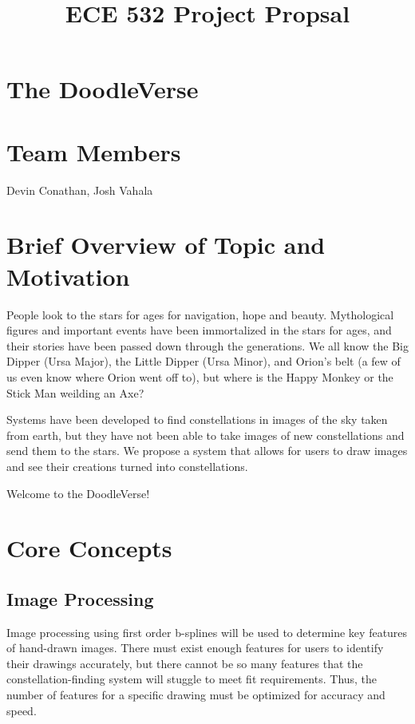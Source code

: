 \documentclass{article}
\title{ECE 532 Project Propsal}
\date{}
\author{}
\makeatletter
\let\saved@bibitem\@bibitem
\makeatother
\begin{document}
\begingroup
  \makeatletter
  \let\@bibitem\saved@bibitem
  
\endgroup

\maketitle

\section{The DoodleVerse}
\section{Team Members}
Devin Conathan, Josh Vahala

\section{Brief Overview of Topic and Motivation}
People look to the stars for ages for navigation, hope and beauty. Mythological figures and important events have been immortalized in the stars for ages, and their stories have been passed down through the generations. We all know the Big Dipper (Ursa Major), the Little Dipper (Ursa Minor), and Orion's belt (a few of us even know where Orion went off to), but where is the Happy Monkey or the Stick Man weilding an Axe?

Systems have been developed to find constellations in images of the sky taken from earth, but they have not been able to take images of new constellations and send them to the stars. We propose a system that allows for users to draw images and see their creations turned into constellations.

Welcome to the DoodleVerse!
\section{Core Concepts}

\subsection{Image Processing}
Image processing using first order b-splines will be used to determine key features of hand-drawn images. There must exist enough features for users to identify their drawings accurately, but there cannot be so many features that the constellation-finding system will stuggle to meet fit requirements. Thus, the number of features for a specific drawing must be optimized for accuracy and speed.
\end{document}
